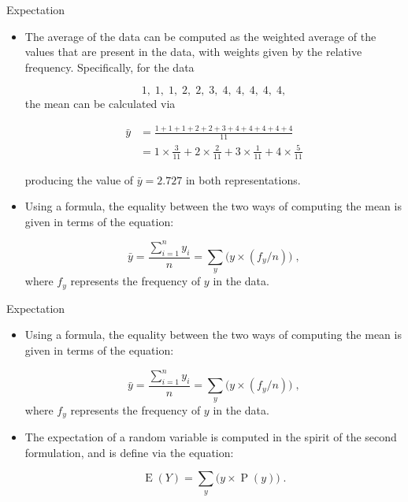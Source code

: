 \documentclass[10pt,handout]{beamer}\usepackage[]{graphicx}\usepackage[]{color}
\newcommand{\Expec}{\operatorname{E}}
\newcommand{\Prob}{\operatorname{P}}
\begin{document}
\begin{frame}[fragile]{Expectation}
	\small
	\begin{itemize}
		
		\item The average of the data can be computed as the weighted average of the values that are present
		in the data, with weights given by the relative frequency. Specifically,
		for the data
		
		$$1,\; 1,\; 1,\; 2,\; 2,\; 3,\; 4,\; 4,\; 4,\; 4,\; 4,$$ the mean can be calculated via
		
		\begin{align*}
			\bar{y} &= \frac{1 + 1 + 1 + 2 + 2 + 3 + 4 + 4 + 4 + 4 + 4}{11}\\
			& =	1\times \frac{3}{11} + 2 \times \frac{2}{11} + 3 \times \frac{1}{11} + 4 \times \frac{5}{11}
		\end{align*}
		
		producing the value of $\bar y =2.727$ in both representations. 
		
		\item Using a formula, the equality between the two ways of computing the mean is
		given in terms of the equation:
		
		$$\bar y = \frac{\sum_{i=1}^n y_i}{n} = \sum_y \big(y \times (f_y/n)\big)\;,$$
		where $f_y$ represents the frequency of $y$ in the data. 
		
		
		
		
	\end{itemize}
	
\end{frame}


\begin{frame}[fragile]{Expectation}
	\small
	\begin{itemize}		
		
		\item Using a formula, the equality between the two ways of computing the mean is
		given in terms of the equation:
		
		$$\bar y = \frac{\sum_{i=1}^n y_i}{n} = \sum_y \big(y \times (f_y/n)\big)\;,$$
		where $f_y$ represents the frequency of $y$ in the data. 
		
		\item The expectation of a random variable is computed in the spirit of the
		second formulation, and is define via the equation:
		
		$$\Expec(Y) = \sum_y \big(y \times \Prob(y)\big)\;.$$
		
		
	\end{itemize}
	
\end{frame}
\end{document}
